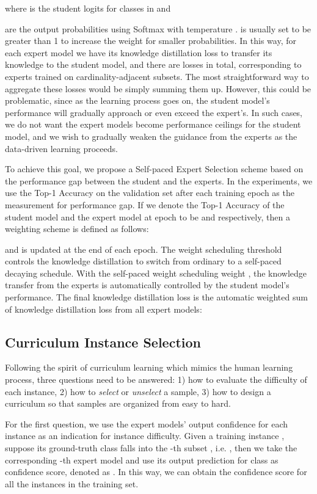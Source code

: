 \documentclass[runningheads]{llncs}
\begin{document}
	where  is the student logits for classes in  and 
	
are the output probabilities using Softmax with temperature  .  is usually set to be greater than 1 to increase the weight for smaller probabilities.
In this way, for each expert model  we have its knowledge distillation loss to transfer its knowledge to the student model, and there are  losses in total, corresponding to  experts trained on  cardinality-adjacent subsets. The most straightforward way to aggregate these losses would be simply summing them up. However, this could be problematic, since as the learning process goes on, the student model's performance will gradually approach or even exceed the expert's. In such cases, we do not want the expert models become performance ceilings for the student model, and we wish to gradually weaken the guidance from the experts as the data-driven learning proceeds.
	
	To achieve this goal, we propose a Self-paced Expert Selection scheme based on the performance gap between the student and the experts. In the experiments, we use the Top-1 Accuracy on the validation set after each training epoch as the measurement for performance gap. If we denote the Top-1 Accuracy of the student model  and the expert model  at epoch  to be  and  respectively, then a weighting scheme is defined as follows:
	
	
	and  is updated at the end of each epoch. The weight scheduling threshold  controls the knowledge distillation to switch from ordinary to a self-paced decaying schedule.
	With the self-paced weight scheduling weight , the knowledge transfer from the experts is automatically controlled by the student model's performance. 
	The final knowledge distillation loss is the automatic weighted sum of knowledge distillation loss from all expert models:
	
	
	\subsection{Curriculum Instance Selection}
	Following the spirit of curriculum learning which mimics the human learning process, three questions need to be answered: 1) how to evaluate the difficulty of each instance, 2) how to \emph{select} or \emph{unselect} a sample, 3) how to design a curriculum so that samples are organized from easy to hard.
	
	For the first question, we use the expert models' output confidence for each instance as an indication for instance difficulty. Given a training instance , suppose its ground-truth class  falls into the -th subset , i.e. , then we take the corresponding -th expert model and use its output prediction for class  as confidence score, denoted as . In this way, we can obtain the confidence score for all the instances in the training set.
\end{document}
